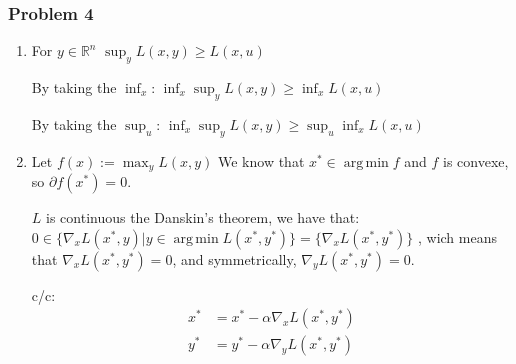 \documentclass[12pt]{article}
\newcommand{\Q}[1]{\subsubsection*{Problem #1}}
\DeclareMathOperator*{\argmin}{arg\,min}
\begin{document}
 
\Q{4}
\begin{enumerate}
\item
  For $y \in \mathbb R^n$
  $\sup_y L(x, y) \ge L(x, u)$

  By taking the $\inf_x$:
  $\inf_x \sup_y L(x, y) \ge \inf_x L(x, u)$

  By taking the $\sup_u$:
  $\inf_x \sup_y L(x, y) \ge \sup_u \inf_x L(x, u)$

\item

  Let $f(x) := \max_y L(x, y)$
  We know that $x^* \in \argmin f$ and $f$ is convexe,
  so $\partial f(x^*) = 0$.

  $L$ is continuous the Danskin's theorem, we have that:
  $0 \in \{ \nabla_x L (x^*, y) | y \in \argmin L(x^*, y^*) \} = \{ \nabla_x L (x^*, y^*) \}$ , wich means that
  $\nabla_x L (x^*, y^*) = 0$, and symmetrically, $\nabla_y L (x^*, y^*) = 0$.

  c/c:
  \begin{align*}
    x^* &= x^* - \alpha \nabla_x L (x^*, y^*)\\
    y^* &= y^* - \alpha \nabla_y L (x^*, y^*)
  \end{align*}
  
\end{enumerate}
\end{document}
